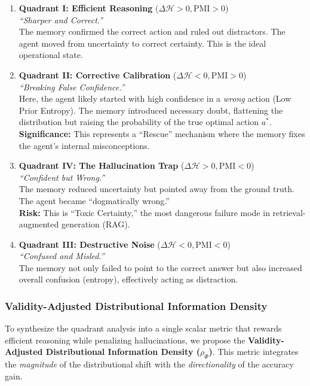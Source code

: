 \begin{enumerate}
    \item \textbf{Quadrant I: Efficient Reasoning} ($\Delta \mathcal{H} > 0, \mathrm{PMI} > 0$) \\
    \textit{``Sharper and Correct.''} \\
    The memory confirmed the correct action and ruled out distractors. The agent moved from uncertainty to correct certainty. This is the ideal operational state.

    \item \textbf{Quadrant II: Corrective Calibration} ($\Delta \mathcal{H} < 0, \mathrm{PMI} > 0$) \\
    \textit{``Breaking False Confidence.''} \\
    Here, the agent likely started with high confidence in a \emph{wrong} action (Low Prior Entropy). The memory introduced necessary doubt, flattening the distribution but raising the probability of the true optimal action $a^*$. \\
    \textbf{Significance:} This represents a ``Rescue'' mechanism where the memory fixes the agent's internal misconceptions.

    \item \textbf{Quadrant IV: The Hallucination Trap} ($\Delta \mathcal{H} > 0, \mathrm{PMI} < 0$) \\
    \textit{``Confident but Wrong.''} \\
    The memory reduced uncertainty but pointed away from the ground truth. The agent became ``dogmatically wrong.'' \\
    \textbf{Risk:} This is ``Toxic Certainty,'' the most dangerous failure mode in retrieval-augmented generation (RAG).

    \item \textbf{Quadrant III: Destructive Noise} ($\Delta \mathcal{H} < 0, \mathrm{PMI} < 0$) \\
    \textit{``Confused and Misled.''} \\
    The memory not only failed to point to the correct answer but also increased overall confusion (entropy), effectively acting as distraction.
\end{enumerate}

\subsubsection{Validity-Adjusted Distributional Information Density}

To synthesize the quadrant analysis into a single scalar metric that rewards efficient reasoning while penalizing hallucinations, we propose the \textbf{Validity-Adjusted Distributional Information Density ($\rho_{\Phi}$)}. This metric integrates the \emph{magnitude} of the distributional shift with the \emph{directionality} of the accuracy gain.

